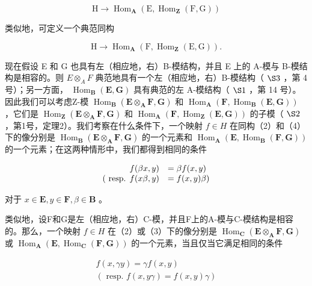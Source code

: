 \[
\mathrm{H} \rightarrow \operatorname{Hom} _ {\mathbf {A}} (\mathrm{E}, \operatorname{Hom} _ {\mathbf {Z}} (\mathrm{F}, \mathrm{G}))\tag{3}
\]

类似地，可定义一个典范同构

\[
\mathrm{H} \rightarrow \operatorname{Hom} _ {\mathbf {A}} (\mathrm{F}, \operatorname{Hom} _ {\mathbf {Z}} (\mathrm{E}, \mathrm{G})).\tag{4}
\]

现在假设 E 和 G 也具有左（相应地，右）B-模结构，并且 E 上的 A-模与 B-模结构是相容的。则 \(E \otimes_{A} F\) 典范地具有一个左（相应地，右）B-模结构（ \(\S 3\) ，第 4 号）；另一方面， \(\operatorname{Hom}_{\mathbf{B}}(\mathbf{E}, \mathbf{G})\) 具有典范的左 A-模结构（ \(\S 1\) ，第 14 号）。因此我们可以考虑Z-模 \(\operatorname{Hom}_{\mathbf{B}}(\mathbf{E} \otimes_{\mathbf{A}} \mathbf{F}, \mathbf{G})\) 和 \(\operatorname{Hom}_{\mathbf{A}}(\mathbf{F}, \operatorname{Hom}_{\mathbf{B}}(\mathbf{E}, \mathbf{G}))\) ，它们是 \(\operatorname{Hom}_{\mathbf{Z}}(\mathbf{E} \otimes_{\mathbf{A}} \mathbf{F}, \mathbf{G})\) 和 \(\operatorname{Hom}_{\mathbf{A}}(\mathbf{F}, \operatorname{Hom}_{\mathbf{Z}}(\mathbf{E}, \mathbf{G}))\) 的子模（ \(\S 2\) ，第1号，定理2）。我们考察在什么条件下，一个映射 \(f \in H\) 在同构（2）和（4）下的像分别是 \(\operatorname{Hom}_{\mathbf{B}}(\mathbf{E} \otimes_{\mathbf{A}} \mathbf{F}, \mathbf{G})\) 的一个元素和 \(\operatorname{Hom}_{\mathbf{A}}(\mathbf{E}, \operatorname{Hom}_{\mathbf{B}}(\mathbf{F}, \mathbf{G}))\) 的一个元素；在这两种情形中，我们都得到相同的条件

\[
\begin{array}{r l} f (\beta x, y) & = \beta f (x, y) \\ (\text { resp.   } f (x \beta , y) & = f (x, y) \beta) \end{array}
\]

对于 \(x \in \mathbf{E}, y \in \mathbf{F}, \beta \in \mathbf{B}\) 。

类似地，设F和G是左（相应地，右）C-模，并且F上的A-模与C-模结构是相容的。那么，一个映射 \(f \in H\) 在（2）或（3）下的像分别是 \(\operatorname{Hom}_{\mathbf{C}}(\mathbf{E} \otimes_{\mathbf{A}} \mathbf{F}, \mathbf{G})\) 或 \(\operatorname{Hom}_{\mathbf{A}}(\mathbf{E}, \operatorname{Hom}_{\mathbf{C}}(\mathbf{F}, \mathbf{G}))\) 的一个元素，当且仅当它满足相同的条件

\[
\begin{array}{c} f (x, \gamma y) = \gamma f (x, y) \\ (\text { resp. } f (x, y \gamma) = f (x, y) \gamma) \end{array}
\]

